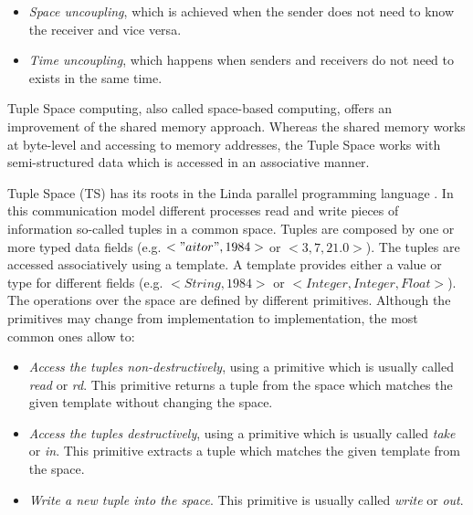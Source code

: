 \begin{itemize}
 \item \emph{Space uncoupling}, which is achieved when the sender does not need to know the receiver and vice versa.
 \item \emph{Time uncoupling}, which happens when senders and receivers do not need to exists in the same time.
\end{itemize}


Tuple Space computing, also called space-based computing, offers an improvement of the shared memory approach.
Whereas the shared memory works at byte-level and accessing to memory addresses,
the Tuple Space works with semi-structured data which is accessed in an associative manner.

Tuple Space (TS) has its roots in the Linda parallel programming language \cite{gelernter_generative_1985}.
In this communication model different processes read and write pieces of information so-called tuples in a common space.
Tuples are composed by one or more typed data fields (e.g. $<"aitor",1984>$ or $<3,7,21.0>$).
The tuples are accessed associatively using a template.
A template provides either a value or type for different fields (e.g. $<String,1984>$ or $<Integer, Integer, Float>$).
The operations over the space are defined by different primitives.
Although the primitives may change from implementation to implementation, the most common ones allow to:

\begin{itemize}
  \item \emph{Access the tuples non-destructively}, using a primitive which is usually called \emph{read} or \emph{rd}.
	This primitive returns a tuple from the space which matches the given template without changing the space.
  \item \emph{Access the tuples destructively}, using a primitive which is usually called \emph{take} or \emph{in}.
	This primitive extracts a tuple which matches the given template from the space.
  \item \emph{Write a new tuple into the space}. This primitive is usually called \emph{write} or \emph{out}.
\end{itemize}

